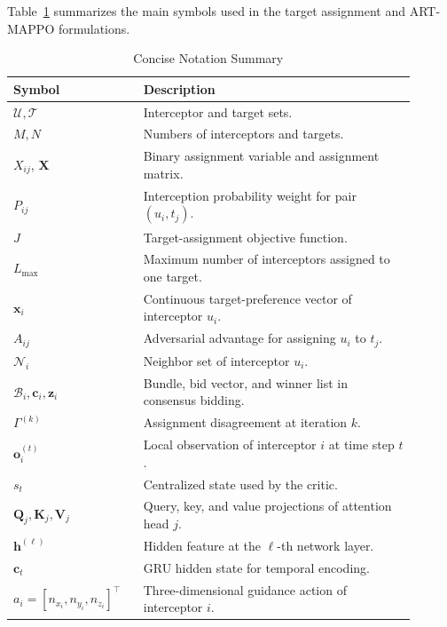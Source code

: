 \documentclass[lettersize,journal]{IEEEtran}
\providecommand{\DIFadd}[1]{{\protect\color{blue} #1}} %
\providecommand{\DIFdel}[1]{} %
\providecommand{\DIFaddFL}[1]{\DIFadd{#1}} %
\providecommand{\DIFdelFL}[1]{\DIFdel{#1}} %
\providecommand{\DIFaddbeginFL}{} %
\providecommand{\DIFaddendFL}{} %
\providecommand{\DIFdelbeginFL}{} %
\providecommand{\DIFdelendFL}{} %
\begin{document}
Table~\ref{tab:notation} summarizes the main symbols used in the target assignment and
ART-MAPPO formulations.

\begin{table}[!t]
\centering
\caption{Concise Notation Summary}
\label{tab:notation}
\renewcommand{\arraystretch}{1.15}
\footnotesize
\begin{tabular}{p{0.28\linewidth}p{0.62\linewidth}}
\toprule
Symbol & Description \\
\midrule
$\mathcal{U},\mathcal{T}$ & Interceptor and target sets. \\
$M,N$ & Numbers of interceptors and targets. \\
$X_{ij}$, $\mathbf{X}$ & Binary assignment variable and assignment matrix. \\
$P_{ij}$ & Interception probability weight for pair $(u_i,t_j)$. \\
$J$ & Target-assignment objective function. \\
$L_{\max}$ & Maximum number of interceptors assigned to one target. \\
$\mathbf{x}_i$ & Continuous target-preference vector of interceptor $u_i$. \\
$A_{ij}$ & Adversarial advantage for assigning $u_i$ to $t_j$. \\
$\mathcal{N}_i$ & Neighbor set of interceptor $u_i$. \\
$\mathcal{B}_i,\mathbf{c}_i,\mathbf{z}_i$ & Bundle, bid vector, and winner list in consensus bidding. \\
$\Gamma^{(k)}$ & Assignment disagreement at iteration $k$. \\
$\mathbf{o}_i^{(t)}$ & Local observation of interceptor $i$ at time step $t$. \\
$s_t$ & Centralized state used by the critic. \\
\DIFaddbeginFL \DIFaddFL{$\mathbf Q_j,\mathbf K_j,\mathbf V_j$ }& \DIFaddFL{Query, key, and value projections of attention head \(j\). }\\
\DIFaddendFL $\mathbf{h}^{(\ell)}$ & Hidden feature at the $\ell$-th network layer. \\
$\mathbf{c}_t$ & GRU hidden state for temporal encoding. \\
\DIFdelbeginFL \DIFdelFL{$a_i$ }\DIFdelendFL \DIFaddbeginFL \DIFaddFL{$a_i=[n_{x_i},n_{y_i},n_{z_i}]^\top$ }\DIFaddendFL & \DIFdelbeginFL \DIFdelFL{Continuous }\DIFdelendFL \DIFaddbeginFL \DIFaddFL{Three-dimensional }\DIFaddendFL guidance action of interceptor $i$. \\

\end{tabular}
\end{table}
\end{document}
